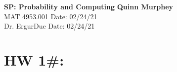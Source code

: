 \documentclass[letterpaper, 12pt]{article}
\begin{document}
\noindent
\large\textbf{SP: Probability and Computing} \hfill \textbf{Quinn Murphey} \\
\normalsize MAT 4953.001 \hfill Date: 02/24/21\\
Dr. Ergur\hfill Due Date: 02/24/21\\
\noindent\makebox[\linewidth]{\rule{\paperwidth}{0.4pt}}


\section*{HW 1\#:}
	
	
	
\end{document}
